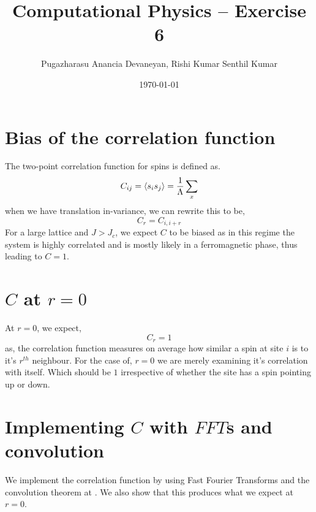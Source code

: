 \documentclass{cernatsnote}
\title{Computational Physics – Exercise 6}
\author{Pugazharasu Anancia Devaneyan, Rishi Kumar Senthil Kumar}
\date{\today}
\begin{document}
\maketitle



\section{Bias of the correlation function}
The two-point correlation function for spins is defined as.
\begin{equation}
    C_{ij} = \expval{s_{i}s_{j}} = \frac{1}{\Lambda} \sum_{x} 
\end{equation}
when we have translation in-variance, we can rewrite this to be,
\begin{equation}
    C_{{r}} = C_{i,i+r}
\end{equation}
For a large lattice and $J>J_c$, we expect $C$ to be biased as in this regime the system is highly correlated and is mostly likely in a ferromagnetic phase, thus leading to $C = 1$.
\section{$C$ at  $r = 0$}
At $r = 0$, we expect,
\begin{equation}
   C_{{r}} = 1
\end{equation}
as, the correlation function measures on average how similar a spin at site $i$ is to it's $r^{th}$ neighbour. For the case of, $r= 0$ we are merely examining it's correlation with itself. Which should be $1$ irrespective of whether the site has a spin pointing up or down.
\section{Implementing $C$ with $FFT$s and convolution}
We implement the correlation function by using Fast Fourier Transforms and the convolution theorem at \cite{github}. We also show that this produces what we expect at $r=0$.
\end{document}
